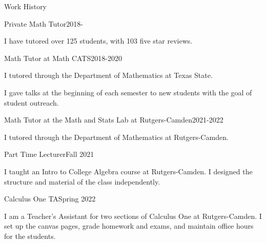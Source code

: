 \documentclass{resume} %
\begin{document}




\begin{rSection}{Work History}

  \begin{rSubsection}{Private Math Tutor}{2018-}{}{}
\item I have tutored over 125 students, with 103 five star reviews.

 
\end{rSubsection} 



\begin{rSubsection}{Math Tutor at Math CATS}{2018-2020}{}{}
\item I tutored through the Department of Mathematics at Texas State. 
\item I gave talks at the beginning of each semester to new students with the goal of student outreach.

\end{rSubsection}


\begin{rSubsection}{Math Tutor at the Math and Stats Lab at Rutgers-Camden}{2021-2022}{}{}
\item I tutored through the Department of Mathematics at Rutgers-Camden.

\end{rSubsection}


\begin{rSubsection}{Part Time Lecturer}{Fall 2021}{}{}
\item I taught an Intro to College Algebra course at Rutgers-Camden. I designed the structure and material of the class independently.
\end{rSubsection}

\begin{rSubsection}{Calculus One TA}{Spring 2022}{}{}
\item I am a Teacher's Assistant for two sections of Calculus One at Rutgers-Camden. I set up the canvas pages, grade homework and exams, and maintain office hours for the students.
\end{rSubsection}


\end{rSection}
\end{document}
